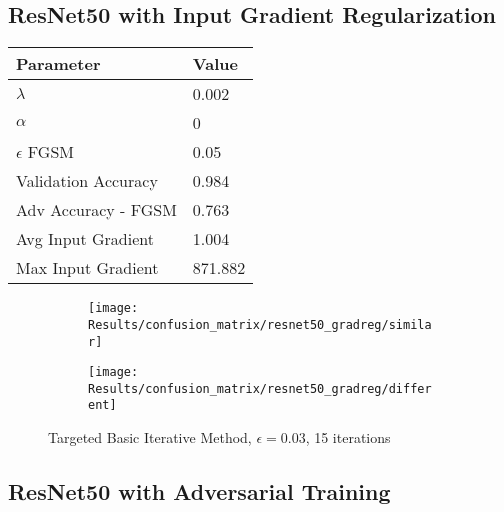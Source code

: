\documentclass[draft,final]{vutinfth} %
\begin{document}
\subsection{ResNet50 with Input Gradient Regularization}

\begin{table}[h]
  \centering
  \begin{tabular}{ll}
    \toprule
			Parameter			& Value   \\
    \midrule
			$\lambda$								& 0.002				\\
			$\alpha$								& 0				\\
			$\epsilon$ FGSM					& 0.05		\\
			
			Validation Accuracy			& 0.984		\\ 
			Adv Accuracy - FGSM			& 0.763		\\
			
			Avg Input Gradient			& 1.004	\\
			Max Input Gradient			& 871.882\\
    \bottomrule
  \end{tabular}
\end{table}


\begin{figure}[h]
  \begin{subfigure}[b]{0.75\columnwidth}
		\centering
    \texttt{[image: Results/confusion\_matrix/resnet50\_gradreg/similar]}
    \label{fig:exp:cm:resnet50_gradreg:similar}
  \end{subfigure}
  \begin{subfigure}[b]{0.75\columnwidth}
		\centering
    \texttt{[image: Results/confusion\_matrix/resnet50\_gradreg/different]}
    \label{fig:exp:cm:resnet50_gradreg:different}
  \end{subfigure}
  \caption{Targeted Basic Iterative Method, $\epsilon = 0.03$, 15 iterations}
  \label{fig:exp:cm:resnet50_gradreg}
\end{figure}


\subsection{ResNet50 with Adversarial Training}
\end{document}
